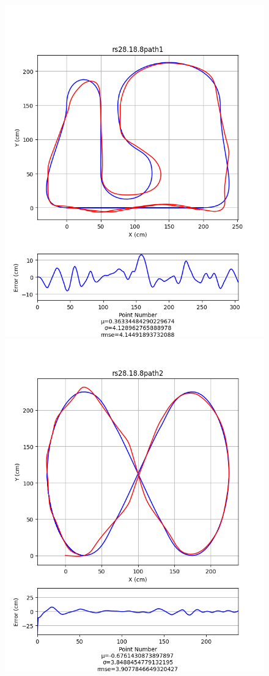 \documentclass[mla7]{mla}
\begin{document}
\begin{paper}
\begin{figure}[H]
\includegraphics[width=\linewidth]{pathData/rspath1}
\endminipage\hfill
{}
\includegraphics[width=\linewidth]{pathData/rspath2}

\end{figure}
\end{paper}
\end{document}
